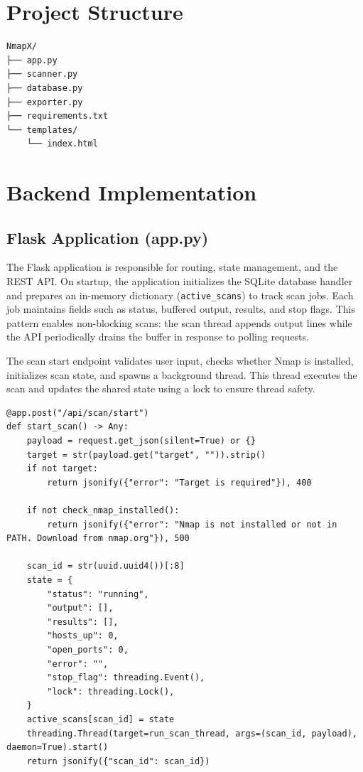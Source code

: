 \documentclass[12pt, a4paper]{report}
\begin{document}
\section{Project Structure}
\begin{lstlisting}[caption={NmapX project structure},label={lst:tree}]
NmapX/
├── app.py
├── scanner.py
├── database.py
├── exporter.py
├── requirements.txt
└── templates/
    └── index.html
\end{lstlisting}

\section{Backend Implementation}

\subsection{Flask Application (app.py)}
The Flask application is responsible for routing, state management, and the REST API. On startup, the application initializes the SQLite database handler and prepares an in-memory dictionary (\texttt{active\_scans}) to track scan jobs. Each job maintains fields such as status, buffered output, results, and stop flags. This pattern enables non-blocking scans: the scan thread appends output lines while the API periodically drains the buffer in response to polling requests.

The scan start endpoint validates user input, checks whether Nmap is installed, initializes scan state, and spawns a background thread. This thread executes the scan and updates the shared state using a lock to ensure thread safety.

\begin{lstlisting}[caption={Example: /api/scan/start route (app.py)},label={lst:scanstart}]
@app.post("/api/scan/start")
def start_scan() -> Any:
    payload = request.get_json(silent=True) or {}
    target = str(payload.get("target", "")).strip()
    if not target:
        return jsonify({"error": "Target is required"}), 400

    if not check_nmap_installed():
        return jsonify({"error": "Nmap is not installed or not in PATH. Download from nmap.org"}), 500

    scan_id = str(uuid.uuid4())[:8]
    state = {
        "status": "running",
        "output": [],
        "results": [],
        "hosts_up": 0,
        "open_ports": 0,
        "error": "",
        "stop_flag": threading.Event(),
        "lock": threading.Lock(),
    }
    active_scans[scan_id] = state
    threading.Thread(target=run_scan_thread, args=(scan_id, payload), daemon=True).start()
    return jsonify({"scan_id": scan_id})
\end{lstlisting}
\end{document}
